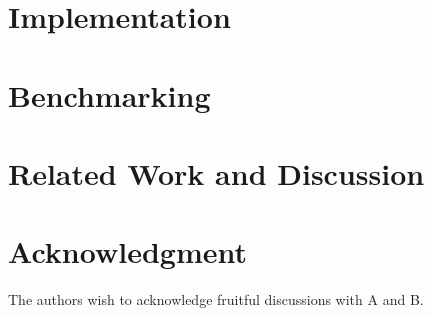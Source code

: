 \documentclass{lmcs} %
\theoremstyle{plain}\newtheorem{satz}[thm]{Satz} %
\begin{document}
\section{Implementation}\label{sec:impl}

\section{Benchmarking}\label{sec:bench}


\section{Related Work and Discussion}


\section*{Acknowledgment}
  \noindent The authors wish to acknowledge fruitful discussions with
  A and B.

%


\end{document}

